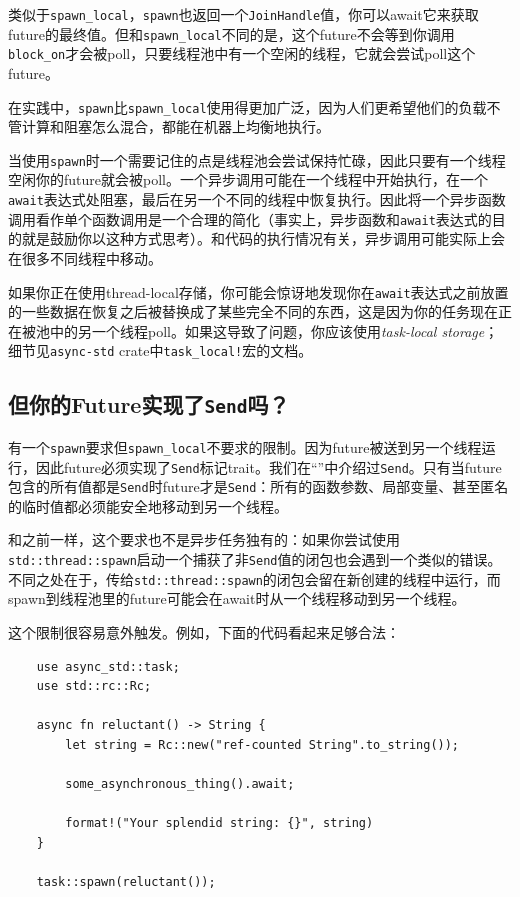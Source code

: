 类似于\texttt{spawn\_local}，\texttt{spawn}也返回一个\texttt{JoinHandle}值，你可以await它来获取future的最终值。但和\texttt{spawn\_local}不同的是，这个future不会等到你调用\texttt{block\_on}才会被poll，只要线程池中有一个空闲的线程，它就会尝试poll这个future。

在实践中，\texttt{spawn}比\texttt{spawn\_local}使用得更加广泛，因为人们更希望他们的负载不管计算和阻塞怎么混合，都能在机器上均衡地执行。

当使用\texttt{spawn}时一个需要记住的点是线程池会尝试保持忙碌，因此只要有一个线程空闲你的future就会被poll。一个异步调用可能在一个线程中开始执行，在一个\texttt{await}表达式处阻塞，最后在另一个不同的线程中恢复执行。因此将一个异步函数调用看作单个函数调用是一个合理的简化（事实上，异步函数和\texttt{await}表达式的目的就是鼓励你以这种方式思考）。和代码的执行情况有关，异步调用可能实际上会在很多不同线程中移动。

如果你正在使用thread-local存储，你可能会惊讶地发现你在\texttt{await}表达式之前放置的一些数据在恢复之后被替换成了某些完全不同的东西，这是因为你的任务现在正在被池中的另一个线程poll。如果这导致了问题，你应该使用\emph{task-local storage}；细节见\texttt{async-std} crate中\texttt{task\_local!}宏的文档。

\subsection{但你的Future实现了\texttt{Send}吗？}
有一个\texttt{spawn}要求但\texttt{spawn\_local}不要求的限制。因为future被送到另一个线程运行，因此future必须实现了\texttt{Send}标记trait。我们在“”中介绍过\texttt{Send}。只有当future包含的所有值都是\texttt{Send}时future才是\texttt{Send}：所有的函数参数、局部变量、甚至匿名的临时值都必须能安全地移动到另一个线程。

和之前一样，这个要求也不是异步任务独有的：如果你尝试使用\texttt{std::thread::spawn}启动一个捕获了非\texttt{Send}值的闭包也会遇到一个类似的错误。不同之处在于，传给\texttt{std::thread::spawn}的闭包会留在新创建的线程中运行，而spawn到线程池里的future可能会在await时从一个线程移动到另一个线程。

这个限制很容易意外触发。例如，下面的代码看起来足够合法：
\begin{verbatim}
    use async_std::task;
    use std::rc::Rc;

    async fn reluctant() -> String {
        let string = Rc::new("ref-counted String".to_string());

        some_asynchronous_thing().await;

        format!("Your splendid string: {}", string)
    }

    task::spawn(reluctant());
\end{verbatim}

